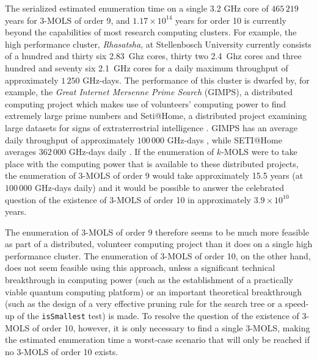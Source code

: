 \documentclass[11pt, a4paper]{article}
\newcommand{\iis}{\texttt{isSmallest} }
\begin{document}
The serialized estimated enumeration time on a single 3.2 GHz core of $465\,219$ years for $3$-MOLS of order 9, and $1.17\times 10^{14}$ years for order 10 is currently beyond  the capabilities of most research computing clusters. For example, the high performance cluster, \emph{Rhasatsha}, at Stellenbosch University currently consists of a hundred and thirty six  2.83~Ghz cores, thirty two 2.4~Ghz cores and three hundred and seventy six 2.1~GHz cores for a daily maximum throughput of approximately $1\,250$ GHz-days. The performance of this cluster is dwarfed by, for example, the \emph{Great Internet Mersenne Prime Search} (GIMPS),  a distributed computing project which makes use of volunteers' computing power to find extremely large prime numbers \cite{gimps} and Seti@Home,  a distributed project examining large datasets for signs of extraterrestrial intelligence \cite{seti}. GIMPS has an average daily throughput of approximately $100\,000$ GHz-days \cite{gimps}, while SETI@Home averages   $362\,000$ GHz-days daily \cite{seti}. If the enumeration of $k$-MOLS were to take place with the computing power that is available to these distributed projects, the enumeration of $3$-MOLS of order 9 would take approximately 15.5 years (at $100\,000$ GHz-days daily) and it would be possible to answer the celebrated question of the existence of $3$-MOLS of order 10 in approximately $3.9\times 10^{10}$ years.

The enumeration of $3$-MOLS of order 9 therefore seems to be much more feasible as part of a distributed, volunteer computing project than it does   on a single high performance cluster. The enumeration of $3$-MOLS of order 10, on the other hand, does not seem feasible using this approach, unless a significant technical breakthrough in computing power (such as the establishment of a practically viable quantum computing platform) or an important theoretical breakthrough (such as the design of a very effective pruning rule for the search tree or a speed-up of the \iis test) is made.
  To resolve the question of  the existence of $3$-MOLS of order 10, however, it is only necessary to find a single $3$-MOLS, making the estimated enumeration time a worst-case scenario that will only be reached if no $3$-MOLS of order 10 exists.
\end{document}
